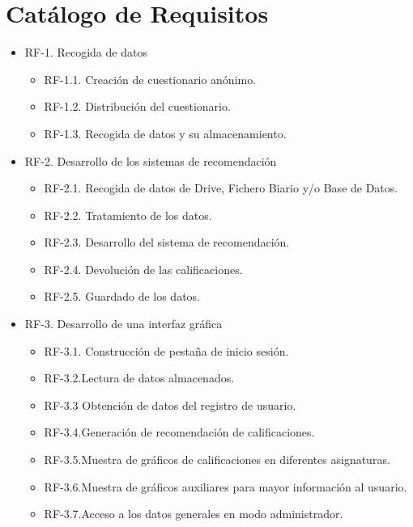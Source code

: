 \section{Catálogo de Requisitos}
\begin{itemize}
\item RF-1. Recogida de datos\\ 
\begin{itemize}
\item RF-1.1. Creación de cuestionario anónimo.\\ 
\item RF-1.2. Distribución del cuestionario. \\ 
\item RF-1.3. Recogida de datos y su almacenamiento. 
\end{itemize}

\item RF-2. Desarrollo de los sistemas de recomendación\\ 
\begin{itemize}
\item RF-2.1. Recogida de datos de Drive, Fichero Biario y/o Base de Datos. 
\item RF-2.2. Tratamiento de los datos. 
\item RF-2.3. Desarrollo del sistema de recomendación. 
\item RF-2.4. Devolución de las calificaciones. 
\item RF-2.5. Guardado de los datos. 
\end{itemize}

\item RF-3. Desarrollo de una interfaz gráfica \\ 
\begin{itemize}
\item RF-3.1. Construcción de pestaña de inicio sesión.  
\item RF-3.2.Lectura de datos almacenados. 
\item RF-3.3 Obtención de datos del registro de usuario. 
\item RF-3.4.Generación de recomendación de calificaciones. 
\item RF-3.5.Muestra de gráficos de calificaciones en diferentes asignaturas. 
\item RF-3.6.Muestra de gráficos auxiliares para mayor información al usuario. 
\item RF-3.7.Acceso a los datos generales en modo administrador. 
\end{itemize}

\end{itemize}

